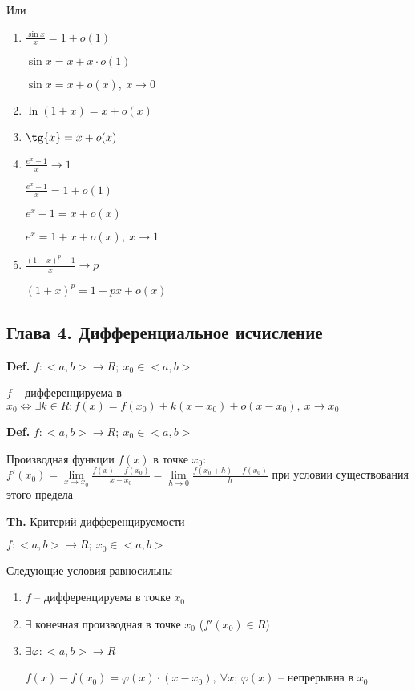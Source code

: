 \documentclass[14pt, letter paper]{article}
\begin{document}
Или

\begin{enumerate}
    \item $\frac{\sin{x}}{x} = 1 + o(1)$

    $\sin{x} = x + x \cdot o(1)$

    $\sin{x} = x + o(x),\ x \rightarrow 0$

    \item $\ln{(1+x)} = x + o(x)$

    \item $\tg{x} = x + o(x)$

    \item $\frac{e^x -1}{x} \rightarrow 1$

    $\frac{e^x-1}{x} = 1 + o(1)$

    $e^x - 1 = x + o(x)$

    $e^x = 1 + x + o(x),\ x \rightarrow 1$

    \item $\frac{(1+x)^p-1}{x} \rightarrow p$

    $(1+x)^p = 1 + px + o(x)$
\end{enumerate}

\begin{center}
    \section*{Глава 4. Дифференциальное исчисление}
\end{center}

\textbf{Def.} $f : <a, b> \rightarrow R;\ x_0 \in <a, b>$

$f$ -- дифференцируема в $x_0 \Leftrightarrow \exists k \in R : f(x) = f(x_0) + k(x - x_0) + o(x - x_0),\ x \rightarrow x_0$

\textbf{Def.} $f : <a, b> \rightarrow R;\ x_0 \in <a, b>$

Производная функции $f(x)$ в точке $x_0$: $f'(x_0) = \lim\limits_{x \rightarrow x_0}{\frac{f(x) - f(x_0)}{x - x_0}} = \lim\limits_{h \rightarrow 0}{\frac{f(x_0 + h) - f(x_0)}{h}}$ при условии существования этого предела

\textbf{Th.} Критерий дифференцируемости

$f : <a, b> \rightarrow R;\ x_0 \in <a, b>$

Следующие условия равносильны

\begin{enumerate}
    \item $f$ -- дифференцируема в точке $x_0$

    \item $\exists$ конечная производная в точке $x_0$ ($f'(x_0) \in R$)

    \item $\exists \varphi : <a, b> \rightarrow R$

    $f(x) - f(x_0) = \varphi(x) \cdot (x - x_0),\ \forall x$; $\varphi(x)$ -- непрерывна в $x_0$
\end{enumerate}
\end{document}
